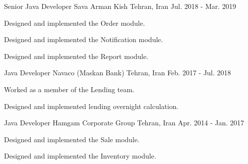 \begin{cventries}
  \cventry
    {Senior Java Developer} %
    {Sava Arman Kish} %
    {Tehran, Iran} %
    {Jul. 2018 - Mar. 2019} %
    {
      \begin{cvitems} %
        \item {Designed and implemented the Order module.}
        \item {Designed and implemented the Notification module.}
        \item {Designed and implemented the Report module.}
      \end{cvitems}
    }

  \cventry
    {Java Developer} %
    {Navaco (Maskan Bank)} %
    {Tehran, Iran} %
    {Feb. 2017 - Jul. 2018} %
    {
      \begin{cvitems} %
        \item {Worked as a member of the Lending team.}
        \item {Designed and implemented lending overnight calculation.}
      \end{cvitems}
    }

  \cventry
    {Java Developer} %
    {Hamgam Corporate Group} %
    {Tehran, Iran} %
    {Apr. 2014 - Jan. 2017} %
    {
      \begin{cvitems} %
        \item {Designed and implemented the Sale module.}
        \item {Designed and implemented the Inventory module.}
      \end{cvitems}
    }

\end{cventries}
